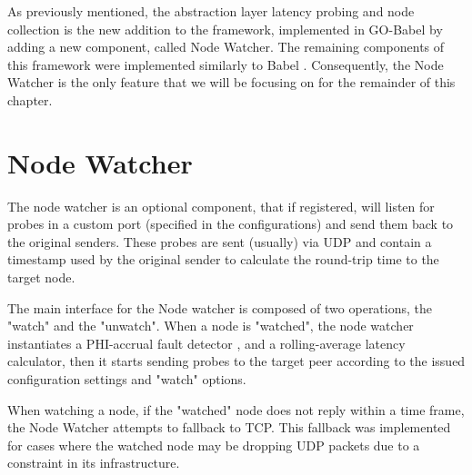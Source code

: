 As previously mentioned, the abstraction layer latency probing and node collection is the new addition to the framework, implemented in GO-Babel by adding a new component, called Node Watcher. The remaining components of this framework were implemented similarly to Babel . Consequently, the Node Watcher is the only feature that we will be focusing on for the remainder of this chapter.


\section{Node Watcher}

The node watcher is an optional component, that if registered, will listen for probes in a custom port (specified in the configurations) and send them back to the original senders. These probes are sent (usually) via UDP and contain a timestamp used by the original sender to calculate the round-trip time to the target node.

The main interface for the Node watcher is composed of two operations, the "watch" and the "unwatch". When a node is "watched", the node watcher instantiates a PHI-accrual fault detector , and a rolling-average latency calculator, then it starts sending probes to the target peer according to the issued configuration settings and "watch" options.

When watching a node, if the "watched" node does not reply within a time frame, the Node Watcher attempts to fallback to TCP. This fallback was implemented for cases where the watched node may be dropping UDP packets due to a constraint in its infrastructure.


